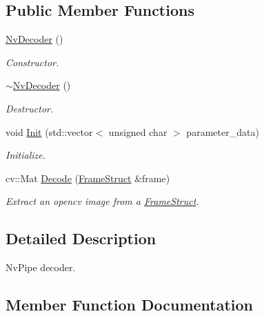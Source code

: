 \subsection*{Public Member Functions}
\begin{DoxyCompactItemize}
\item 
\mbox{\label{classmoetsi_1_1ssp_1_1NvDecoder_a40f19812c72e18affbc63a52a3bc223c}} 
\hyperlink{classmoetsi_1_1ssp_1_1NvDecoder_a40f19812c72e18affbc63a52a3bc223c}{Nv\+Decoder} ()
\begin{DoxyCompactList}\small\item\em Constructor. \end{DoxyCompactList}\item 
\mbox{\label{classmoetsi_1_1ssp_1_1NvDecoder_a5371674e976b6dd011448034ceda2ae9}} 
\hyperlink{classmoetsi_1_1ssp_1_1NvDecoder_a5371674e976b6dd011448034ceda2ae9}{$\sim$\+Nv\+Decoder} ()
\begin{DoxyCompactList}\small\item\em Destructor. \end{DoxyCompactList}\item 
void \hyperlink{classmoetsi_1_1ssp_1_1NvDecoder_a004e8a1ed5618df951477c9bb955b6ec}{Init} (std\+::vector$<$ unsigned char $>$ parameter\+\_\+data)
\begin{DoxyCompactList}\small\item\em Initialize. \end{DoxyCompactList}\item 
cv\+::\+Mat \hyperlink{classmoetsi_1_1ssp_1_1NvDecoder_a78eb894b6825ac5ec57f5a4f4ecd7e31}{Decode} (\hyperlink{structmoetsi_1_1ssp_1_1FrameStruct}{Frame\+Struct} \&frame)
\begin{DoxyCompactList}\small\item\em Extract an opencv image from a \hyperlink{structmoetsi_1_1ssp_1_1FrameStruct}{Frame\+Struct}. \end{DoxyCompactList}\end{DoxyCompactItemize}


\subsection{Detailed Description}
Nv\+Pipe decoder. 

\subsection{Member Function Documentation}
\mbox{\label{classmoetsi_1_1ssp_1_1NvDecoder_a78eb894b6825ac5ec57f5a4f4ecd7e31}} 
